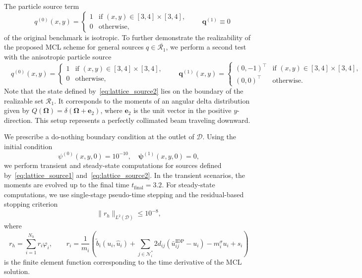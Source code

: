\documentclass[preprint, 11pt]{elsarticle}
\newcommand{\N}{\mathcal{N}}
\newcommand{\D}{\mathcal{D}}
\newcommand{\OO}{\bm{\Omega}}
\newcommand{\pz}{\psi^{(0)}}
\newcommand{\po}{\boldsymbol{\psi}^{(1)}}
\begin{document}
The particle source term
\begin{equation}\label{eq:lattice_source1}
        \quad q^{(0)}(x,y) =\begin{cases}
            1 & \text{if } (x,y) \in [3,4]\times[3,4],\\
            0 & \text{otherwise},
        \end{cases}\qquad \mathbf{q}^{(1)}\equiv0
\end{equation}
of the original benchmark is isotropic.
To further demonstrate the realizability of the proposed MCL scheme for general sources $q\in\overline{\mathcal{R}_1}$, we perform a second test with the
 anisotropic particle source
\begin{equation}\label{eq:lattice_source2}
        \quad q^{(0)}(x,y) =\begin{cases}
            1 & \text{if } (x,y) \in [3,4]\times[3,4],\\
            0 & \text{otherwise},
        \end{cases}\qquad \mathbf{q}^{(1)}(x,y)=\begin{cases}
             (0, -1)^\top & \text{if } (x,y) \in [3,4]\times[3,4],\\
            (0,0)^\top & \text{otherwise}.
        \end{cases}
\end{equation}
Note that the state defined by~\eqref{eq:lattice_source2} lies on the boundary of the realizable set $\mathcal R_1$.
It corresponds to the moments of an angular delta distribution given by $Q(\OO)=\delta(\OO+\mathbf{e}_2)$, where $\mathbf{e}_2$ is the unit vector in the positive $y$-direction.
This setup represents a perfectly collimated beam traveling downward.

We prescribe a do-nothing boundary condition at the outlet of $\mathcal D$.
Using the
initial condition 
\begin{equation}\label{eq:Lattice_init}
\pz(x,y,0) = 10^{-10}, \quad \po(x,y,0) = 0,
\end{equation}
we perform transient and steady-state computations for sources defined by~\eqref{eq:lattice_source1} and~\eqref{eq:lattice_source2}.
In the transient scenarios, the moments are evolved up to the final time $t_{\mathrm{final}} = 3.2$. For steady-state computations, we use single-stage pseudo-time stepping and the residual-based stopping criterion
\begin{equation*}
    \|r_h\|_{L^2(\D)} \leq 10^{-8},
\end{equation*}
where
\begin{equation*}
   r_h = \sum_{i=1}^{N_h} r_i \varphi_i,\qquad
   r_i =\frac{1}{m_i}\left(\tilde{b}_i(u_i, \hat u_i) +\sum_{j \in\N_i^*}2d_{ij} (\bar u_{ij}^{\mathrm{IDP}} -u_i) - m_i^{\sigma}u_i + s_i \right) 
\end{equation*}
is the finite element function corresponding to the time derivative of the MCL solution.
\end{document}
